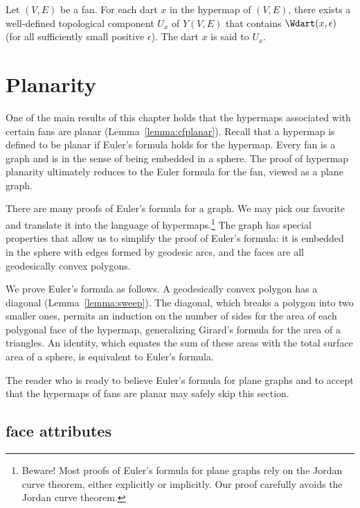 \begin{definition}
  Let $(V,E)$ be a fan.  For each dart $x$ in the hypermap of $(V,E)$,
  there exists a well-defined topological component $U_x$ of $Y(V,E)$
  that contains $\Wdart(x,\epsilon)$ (for all sufficiently small
  positive $\epsilon$). The dart $x$ is said to  $U_x$.
\end{definition}
%


\section{Planarity}

One of the main results of this chapter holds that the hypermaps
associated with certain fans are planar (Lemma~\ref{lemma:cfplanar}).
Recall that a hypermap is defined to be planar if Euler's formula
holds for the hypermap.  Every fan is a graph and is  in
the sense of being embedded in a sphere.  The proof of hypermap
planarity ultimately reduces to the Euler formula for the fan, viewed
as a plane graph.

There are many proofs of Euler's formula for a graph.  We may pick our
favorite and translate it into the language of
hypermaps.\footnote{Beware!  Most proofs of Euler's formula for plane
  graphs rely on the Jordan curve theorem, either explicitly or
  implicitly.  Our proof carefully avoids the Jordan curve theorem.}
The graph has special properties that allow us to simplify the proof
of Euler's formula: it is embedded in the sphere with edges formed by
geodesic arcs, and the faces are all geodesically convex polygons.

We prove Euler's formula as follows.  A geodesically convex polygon
has a diagonal (Lemma~\ref{lemma:sweep}).  The diagonal, which breaks
a polygon into two smaller ones, permits an induction on the number of
sides for the area of each polygonal face of the hypermap,
generalizing Girard's formula for the area of a triangles.  An identity, which
equates the sum of these areas with the total surface area of a sphere, is
equivalent to Euler's formula.


The reader who is ready to believe Euler's formula for plane graphs
and to accept that the hypermaps of fans are planar may safely skip
this section.

\subsection{face attributes}


